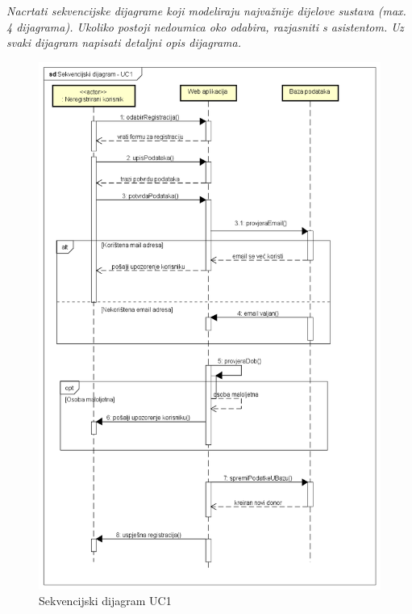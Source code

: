 				\textit{Nacrtati sekvencijske dijagrame koji modeliraju najvažnije dijelove sustava (max. 4 dijagrama). Ukoliko postoji nedoumica oko odabira, razjasniti s asistentom. Uz svaki dijagram napisati detaljni opis dijagrama.}
				\begin{figure}[H]
					\includegraphics[scale=0.4]{slike/Dijagrami/Sekvencijski dijagram - UC1} %
					\centering
					\caption{Sekvencijski dijagram UC1}
					\label{fig:promjene}
				\end{figure}
